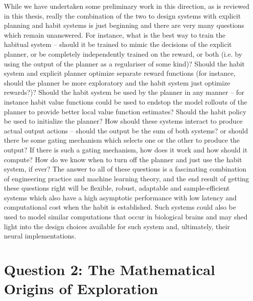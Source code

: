 While we have undertaken some preliminary work in this direction, as is reviewed in this thesis, really the combination of the two to design systems with explicit planning and habit systems is just beginning and there are very many questions which remain unanswered. For instance, what is the best way to train the habitual system -- should it be trained to mimic the decisions of the explicit planner, or be completely independently trained on the reward, or both (i.e. by using the output of the planner as a regulariser of some kind)? Should the habit system and explicit planner optimize separate reward functions (for instance, should the planner be more exploratory and the habit system just optimize rewards?)? Should the habit system be used by the planner in any manner -- for instance habit value functions could be used to endstop the model rollouts of the planner to provide better local value function estimates? Should the habit policy be used to initialize the planner? How should these systems interact to produce actual output actions -- should the output be the sum of both systems? or should there be some gating mechanism which selects one or the other to produce the output? If there is such a gating mechanism, how does it work and how should it compute? How do we know when to turn off the planner and just use the habit system, if ever? The answer to all of these questions is a fascinating combination of engineering practice and machine learning theory, and the end result of getting these questions right will be flexible, robust, adaptable and sample-efficient systems which also have a high asymptotic performance with low latency and computational cost when the habit is established. Such systems could also be used to model similar computations that occur in biological brains and may shed light into the design choices available for such system and, ultimately, their neural implementations.


\section{Question 2: The Mathematical Origins of Exploration}

